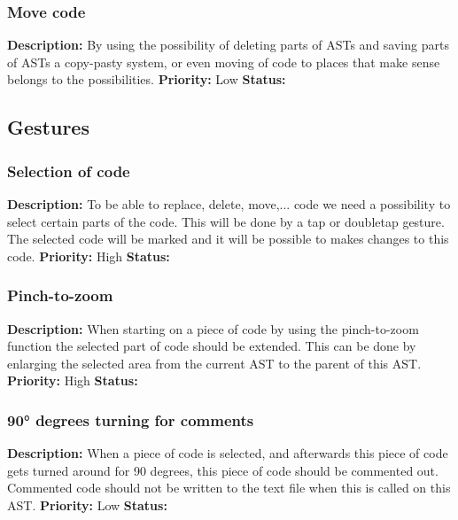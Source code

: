 \documentclass[a4paper,12pt]{report}
\begin{document}
\subsubsection{Move code}
\textbf{Description: } By using the possibility of deleting parts of ASTs and saving parts of ASTs a copy-pasty system, or even moving of code to places that make sense belongs
to the possibilities.\newline
\textbf{Priority:} Low \newline
\textbf{Status: } \newline
\subsection{Gestures}
\subsubsection{Selection of code}
\textbf{Description: } To be able to replace, delete, move,... code we need a possibility to select certain parts of the code. This will be done
by a tap or doubletap gesture. The selected code will be marked and it will be possible to makes changes to this code.\newline
\textbf{Priority:} High \newline
\textbf{Status: } \newline
\subsubsection{Pinch-to-zoom}
\textbf{Description: }When starting on a piece of code by using the pinch-to-zoom function the selected part of code should be extended. This can be done by enlarging the selected
area from the current AST to the parent of this AST. \newline
\textbf{Priority:} High \newline
\textbf{Status: } \newline
\subsubsection{90° degrees turning for comments}
\textbf{Description: }When a piece of code is selected, and afterwards this piece of code gets turned around for 90 degrees, this piece of code should be commented out. 
Commented code should not be written to the text file when this is called on this AST. \newline
\textbf{Priority:} Low \newline
\textbf{Status: } \newline
\end{document}

